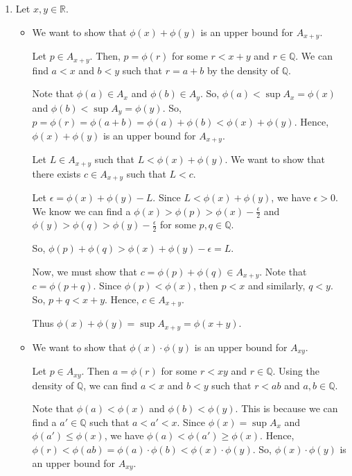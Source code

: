 \documentclass[12pt]{article}
\begin{document}
\begin{enumerate}[start=1,label={\bfseries Problem \arabic*:},leftmargin=1in]
\begin{enumerate}
        \item Let $x, y \in \mathbb{R}$. 
        
        \begin{itemize}
            \item  We want to show that $\phi(x) + \phi(y)$ is an upper bound for $A_{x+y}$. 
        
            Let $p \in A_{x+y}$. Then, $p = \phi(r)$ for some $r < x + y$ and $r \in \mathbb{Q}$.
            We can find $a < x$ and $b < y$ such that $r = a + b$ by the density of $\mathbb{Q}$. 
            
            Note that $\phi(a) \in A_{x}$ and $\phi(b) \in A_{y}$. So, $\phi(a) < \sup A_{x} = \phi(x)$ and $\phi(b) < \sup A_{y} = \phi(y)$.
            So, $p = \phi(r) = \phi(a + b) = \phi(a) + \phi(b) < \phi(x) + \phi(y)$. Hence, $\phi(x) + \phi(y)$ is an upper bound for $A_{x+y}$.
        
            Let $L \in A_{x+y}$ such that $L < \phi(x) + \phi(y)$. We want to show that there exists $c \in A_{x+y}$ such that $L < c$.
            
            Let $\epsilon = \phi(x) + \phi(y) - L$. Since $L < \phi(x) + \phi(y)$, we have $\epsilon > 0$.
            We know we can find a $\phi(x) > \phi(p) > \phi(x) - \frac{\epsilon}{2}$ and $\phi(y) > \phi(q) > \phi(y) - \frac{\epsilon}{2}$ for some $p, q \in \mathbb{Q}$.
    
            So, $\phi(p) + \phi(q) > \phi(x) + \phi(y) - \epsilon = L$. 
    
            Now, we must show that $c = \phi(p) + \phi(q) \in A_{x+y}$. Note that $c = \phi(p + q)$. 
            Since $\phi(p) < \phi(x)$, then $p < x$ and similarly, $q < y$. So, $p + q < x + y$. Hence, $c \in A_{x+y}$.
        
            Thus $\phi(x) + \phi(y) = \sup A_{x+y} = \phi(x + y)$.

            \item We want to show that $\phi(x) \cdot \phi(y)$ is an upper bound for $A_{xy}$.
            
            Let $p \in A_{xy}$. Then $a = \phi(r)$ for some $r < xy$ and $r \in \mathbb{Q}$.
            Using the density of $\mathbb{Q}$, we can find $a < x$ and $b < y$ such that $r < ab$ and $a, b\in \mathbb{Q}$. 

            Note that $\phi(a) < \phi(x)$ and $\phi(b) < \phi(y)$. This is because we can find a $a' \in \mathbb{Q}$ such that $a < a' < x$. 
            Since $\phi(x) = \sup A_{x}$ and $\phi(a') \leq \phi(x)$, we have $\phi(a) < \phi(a') \geq \phi(x)$. Hence, $\phi(r) < \phi(ab) = \phi(a) \cdot \phi(b) < \phi(x) \cdot \phi(y)$.
            So, $\phi(x) \cdot \phi(y)$ is an upper bound for $A_{xy}$.


\end{itemize}
\end{enumerate}
\end{enumerate}
\end{document}
